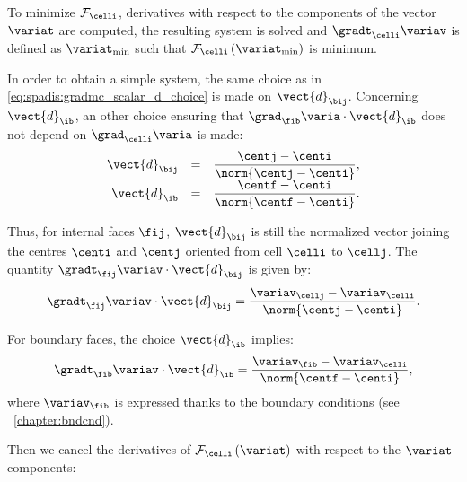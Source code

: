 To minimize $\mathcal{F}_{\celli}$, derivatives with respect to the components of the
vector $\variat  $ are computed, the resulting system is solved and $\gradt_\celli \variav$ is defined
as $\variat_{\min}$ such that $\mathcal{F}_{\celli} \left( \variat_{\min}\right)$ is minimum.

In order to obtain a simple system, the same choice as in \eqref{eq:spadis:gradmc_scalar_d_choice} is made on $\vect{d}_{\bij}$.
Concerning $\vect{d}_\ib$, an other choice ensuring that $\grad_{\fib} \varia   \cdot \vect{d}_\ib $ does not
depend on $\grad_{\celli} \varia $ is made:
%
\begin{equation}\label{eq:spadis:gradmv_scalar_d_choice}
\begin{array}{r c l}
\vect{d}_{\bij} &=& \dfrac{\centj - \centi}{\norm{\centj - \centi}}, \\
\vect{d}_\ib &=& \dfrac{\centf - \centi}{\norm{\centf - \centi}} .
\end{array}
\end{equation}

Thus, for internal faces $\fij$, $\vect{d}_{\bij}$ is still the normalized vector joining
the centres $\centi$ and $\centj$ oriented from cell $\celli$ to $\cellj$.
The quantity  $\gradt_{\fij} \variav   \cdot \vect{d}_{\bij}$ is given by:
\begin{equation}
\gradt_{\fij} \variav   \cdot \vect{d}_{\bij} =\dfrac{\variav_{\cellj} - \variav_{\celli} }{\norm{\centj - \centi}}.
\end{equation}

For boundary faces, the choice $\vect{d}_\ib$ implies:
\begin{equation}
\gradt_{\fib} \variav   \cdot \vect{d}_\ib =\dfrac{\variav_{\fib} - \variav_{\celli} }{\norm{\centf - \centi}},
\end{equation}
where $\variav_{\fib}$ is expressed thanks to the boundary conditions (see \chaptername~\ref{chapter:bndcnd}).

Then we cancel the derivatives of
$\mathcal{F}_{\celli} \left( \variat \right)$ with respect to the $ \variat$ components:


